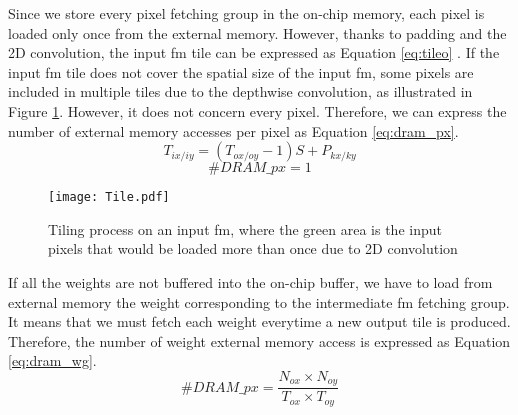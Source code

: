 Since we store every pixel fetching group in the on-chip memory, each pixel is loaded only once from the external memory. However, thanks to padding and the 2D convolution, the input \acrshort{fm} tile can be expressed as Equation \eqref{eq:tileo} \cite{ma_optimizing_2018}. If the input \acrshort{fm} tile does not cover the spatial size of the input \acrshort{fm}, some pixels are included in multiple tiles due to the depthwise convolution, as illustrated in Figure \ref{fig:tilei}. However, it does not concern every pixel. Therefore, we can express the number of external memory accesses per pixel as Equation \eqref{eq:dram_px}.
%
\begin{equation}
    T_{ix/iy} = \left( T_{ox/oy} - 1\right) S + P_{kx/ky}
    \label{eq:tileo}
\end{equation}
\begin{equation}
    \#DRAM\_px = 1
    \label{eq:dram_px}
\end{equation}
%
\begin{figure}[H]
    \centering
    \texttt{[image: Tile.pdf]}
    \caption{Tiling process on an input \acrshort{fm}, where the green area is the input pixels that would be loaded more than once due to 2D convolution}
    \label{fig:tilei}
\end{figure}
%
If all the weights are not buffered into the on-chip buffer, we have to load from external memory the weight corresponding to the intermediate \acrshort{fm} fetching group. It means that we must fetch each weight everytime a new output tile is produced. Therefore, the number of weight external memory access is expressed as Equation \eqref{eq:dram_wg}.
%
\begin{equation}
    \#DRAM\_px = \frac{N_{ox} \times N_{oy}}{T_{ox} \times T_{oy}}
    \label{eq:dram_wg}
\end{equation}
%
